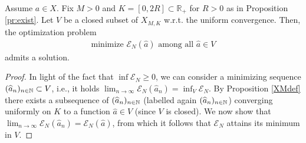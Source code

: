 \begin{proposition}\label{ENmin}
Assume $a \in X$. Fix $M > 0$ and $K=[0,2R] \subset  \mathbb R_+$ for $R>0$ as in Proposition \ref{pr:exist}. Let $V$ be a closed subset of $X_{M,K}$ w.r.t. the uniform convergence. Then, the optimization problem
\begin{align*}
	\mbox{minimize } \mathcal E_N(\widehat a) \mbox{ among all } \widehat a \in V
\end{align*}
admits a solution.
\end{proposition}
\begin{proof}
In light of the fact that $\inf \mathcal E_N \geq 0$, we can consider a minimizing sequence $(\widehat a_n)_{n \in \mathbb{N}} \subset V$, i.e., it holds $\lim_{n \rightarrow \infty} \mathcal E_N(\widehat a_n) = \inf_{V} \mathcal E_N$. By Proposition \ref{XMdef} there exists a subsequence of $(\widehat a_n)_{n \in \mathbb{N}}$ (labelled again $(\widehat a_n)_{n \in \mathbb{N}}$) converging uniformly on $K$ to a function $\widehat a \in V$ (since $V$ is closed). We now show that $\lim_{n \rightarrow \infty} \mathcal E_N(\widehat a_n) = \mathcal  E_N(\widehat a)$, from which it follows  that $\mathcal  E_N$ attains its minimum in $V$. 


\end{proof}
